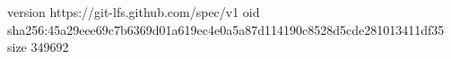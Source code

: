 version https://git-lfs.github.com/spec/v1
oid sha256:45a29eee69c7b6369d01a619ec4e0a5a87d114190c8528d5cde281013411df35
size 349692
